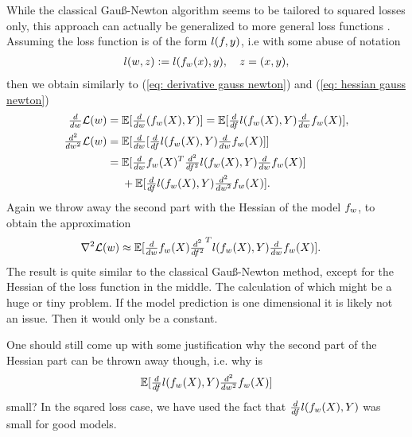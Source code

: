 While the classical Gauß-Newton algorithm seems to be tailored to squared losses
only, this approach can actually be generalized to more general loss functions
\parencite{schraudolphFastCurvatureMatrixVector2001}. Assuming the loss function
is of the form \(l(f,y)\), i.e with some abuse of notation
\begin{align*}
	l(w, z) := l(f_{w}(x), y), \quad z=(x,y),
\end{align*}
then we obtain similarly to (\ref{eq: derivative gauss newton}) and (\ref{eq:
hessian gauss newton})
\begin{align}
	\label{eq: derivative generalized gauss newton}
	\tfrac{d}{dw}\mathcal{L}(w)
	&= \mathbb{E}[\tfrac{d}{dw}(f_{w}(X), Y)]
	= \mathbb{E}[\tfrac{d}{df}l(f_{w}(X),Y)\tfrac{d}{dw}f_{w}(X)],\\
	\label{eq: hessian generalized gauss newton}
	\tfrac{d^2}{dw^2}\mathcal{L}(w)
	&=\mathbb{E}[\tfrac{d}{dw}[\tfrac{d}{df}l(f_{w}(X),Y)\tfrac{d}{dw}f_{w}(X)]]\\
	\nonumber
	&=\begin{aligned}[t]
		&\mathbb{E}[\tfrac{d}{dw}f_{w}(X)^T\tfrac{d^2}{df^2}l(f_{w}(X),Y)\tfrac{d}{dw}f_{w}(X)]\\
		&+ \mathbb{E}[\tfrac{d}{df}l(f_{w}(X),Y)\tfrac{d^2}{dw^2}f_{w}(X)].
	\end{aligned}
\end{align}
Again we throw away the second part with the Hessian of the model \(f_{w}\),
to obtain the approximation
\begin{align*}
	\nabla^2\mathcal{L}(w)
	&\approx\mathbb{E}[\tfrac{d}{dw}f_{w}(X)\tfrac{d^2}{df^2}^Tl(f_{w}(X),Y)\tfrac{d}{dw}f_{w}(X)].
\end{align*}
The result is quite similar to the classical Gauß-Newton method, except for the
Hessian of the loss function in the middle. The calculation of which might be a
huge or tiny problem. If the model prediction is one dimensional it is likely
not an issue. Then it would only be a constant.

One should still come up with some justification why the second part of the
Hessian part can be thrown away though, i.e. why is
\begin{align*}
	\mathbb{E}[\tfrac{d}{df}l(f_{w}(X),Y)\tfrac{d^2}{dw^2}f_{w}(X)]
\end{align*}
small? In the sqared loss case, we have used the fact that
\(\tfrac{d}{df}l(f_{w}(X),Y)\) was small for good models.

